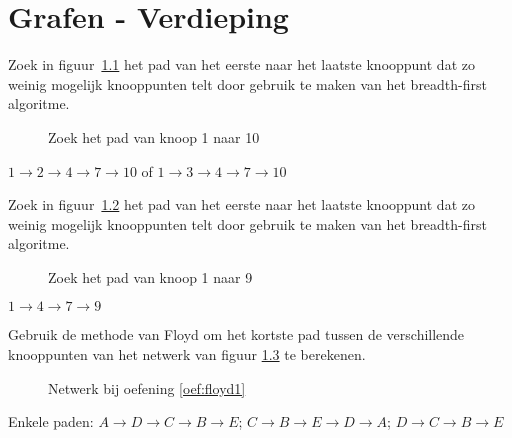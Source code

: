 \chapter{Grafen - Verdieping}

\begin{oef}
\papier Zoek in figuur~\ref{fig:oefFloyd1a} het pad van het eerste naar het laatste knooppunt dat zo weinig mogelijk knooppunten telt door gebruik te maken van het breadth-first algoritme.
\begin{figure}[htbp]
\centering

\caption{Zoek het pad van knoop 1 naar 10}
\label{fig:oefFloyd1a}
\end{figure}

\begin{opl}
$1\rightarrow2\rightarrow4\rightarrow7\rightarrow10$
of 
$1\rightarrow3\rightarrow4\rightarrow7\rightarrow10$
\end{opl}
\end{oef}

\begin{oef}
\papier Zoek in figuur~\ref{fig:oefFloyd1b} het pad van het eerste naar het laatste knooppunt dat zo weinig mogelijk knooppunten telt door gebruik te maken van het breadth-first algoritme.
\begin{figure}[htbp]
\centering

\caption{Zoek het pad van knoop 1 naar 9}
\label{fig:oefFloyd1b}
\end{figure}


\begin{opl}
$1\rightarrow4\rightarrow7\rightarrow9$
\end{opl}
\end{oef}



\newpage
\begin{oef}
\label{oef:floyd1}
\papier Gebruik de methode van Floyd om het kortste pad tussen de verschillende knooppunten van het netwerk van figuur \ref{fig:oefFloyd1} te berekenen.
\begin{figure}[htbp]
\centering

\caption{Netwerk bij oefening \ref{oef:floyd1}}
\label{fig:oefFloyd1}
\end{figure}
\begin{opl}
Enkele paden: $A\rightarrow D\rightarrow C\rightarrow B\rightarrow E$;  $C\rightarrow B\rightarrow E\rightarrow D\rightarrow A$; $D\rightarrow C\rightarrow B\rightarrow E$
\end{opl}
\end{oef}

